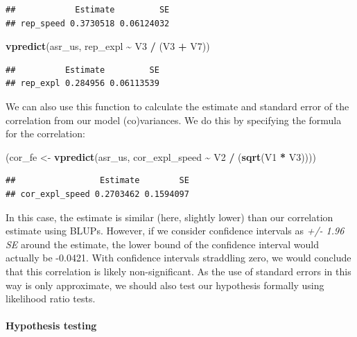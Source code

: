 \documentclass[
  12pt,
]{book}
\newenvironment{Shaded}{\begin{snugshade}}{\end{snugshade}}
\newcommand{\KeywordTok}[1]{\textcolor[rgb]{0.13,0.29,0.53}{\textbf{#1}}}
\newcommand{\NormalTok}[1]{#1}
\newcommand{\OperatorTok}[1]{\textcolor[rgb]{0.81,0.36,0.00}{\textbf{#1}}}
\newcommand{\StringTok}[1]{\textcolor[rgb]{0.31,0.60,0.02}{#1}}
\begin{document}
\begin{verbatim}
##            Estimate         SE
## rep_speed 0.3730518 0.06124032
\end{verbatim}

\begin{Shaded}
\begin{Highlighting}[]
\KeywordTok{vpredict}\NormalTok{(asr\_us, rep\_expl }\OperatorTok{\textasciitilde{}}\StringTok{ }\NormalTok{V3 }\OperatorTok{/}\StringTok{ }\NormalTok{(V3 }\OperatorTok{+}\StringTok{ }\NormalTok{V7))}
\end{Highlighting}
\end{Shaded}

\begin{verbatim}
##          Estimate         SE
## rep_expl 0.284956 0.06113539
\end{verbatim}

We can also use this function to calculate the estimate and standard error of the correlation from our model (co)variances. We do this by specifying the formula for the correlation:

\begin{Shaded}
\begin{Highlighting}[]
\NormalTok{(cor\_fe \textless{}{-}}\StringTok{ }\KeywordTok{vpredict}\NormalTok{(asr\_us, cor\_expl\_speed }\OperatorTok{\textasciitilde{}}\StringTok{ }\NormalTok{V2 }\OperatorTok{/}\StringTok{ }\NormalTok{(}\KeywordTok{sqrt}\NormalTok{(V1 }\OperatorTok{*}\StringTok{ }\NormalTok{V3))))}
\end{Highlighting}
\end{Shaded}

\begin{verbatim}
##                 Estimate        SE
## cor_expl_speed 0.2703462 0.1594097
\end{verbatim}

In this case, the estimate is similar (here, slightly lower) than our correlation estimate using BLUPs.
However, if we consider confidence intervals as \emph{+/- 1.96 SE} around the estimate, the lower bound of the confidence interval would actually be -0.0421.
With confidence intervals straddling zero, we would conclude that this correlation is likely non-significant.
As the use of standard errors in this way is only approximate, we should also test our hypothesis formally using likelihood ratio tests.

\hypertarget{hypothesis-testing}{%
\paragraph{Hypothesis testing}\label{hypothesis-testing}}
\end{document}
